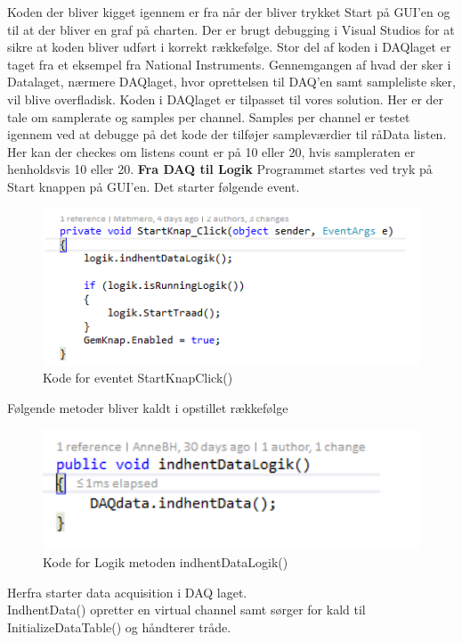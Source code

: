 Koden der bliver kigget igennem er fra når der bliver trykket Start på GUI'en og til at der bliver en graf på charten. Der er brugt debugging i Visual Studios for at sikre at koden bliver udført i korrekt rækkefølge. Stor del af koden i DAQlaget er taget fra et eksempel fra National Instruments. Gennemgangen af hvad der sker i Datalaget, nærmere DAQlaget, hvor oprettelsen til DAQ’en samt sampleliste sker, vil blive overfladisk. Koden i DAQlaget er tilpasset til vores solution. Her er der tale om samplerate og samples per channel. Samples per channel er testet igennem ved at debugge på det kode der tilføjer sampleværdier til råData listen. Her kan der checkes om listens count er på 10 eller 20, hvis sampleraten er henholdsvis 10 eller 20.
\textbf{Fra DAQ til Logik}
Programmet startes ved tryk på Start knappen på GUI'en. Det starter følgende event.
\begin{figure}[H]
	\centering
	\includegraphics[width=1.0\textwidth]{FigurerProgram/StartKnap}
	\caption{Kode for eventet StartKnapClick()}
\end{figure}
Følgende metoder bliver kaldt i opstillet rækkefølge

\begin{figure}[H]
	\centering
	\includegraphics[width=1.0\textwidth]{FigurerProgram/IndhentDataLogik}
	\caption{Kode for Logik metoden indhentDataLogik()}
\end{figure}

Herfra starter data acquisition i DAQ laget.
\\ IndhentData() opretter en virtual channel samt sørger for kald til InitializeDataTable() og håndterer tråde.


